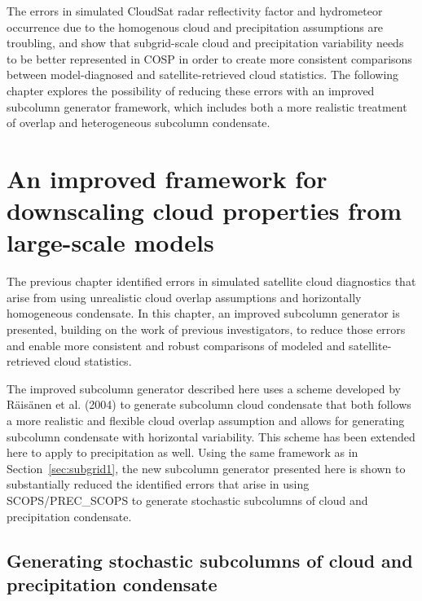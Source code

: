 The errors in simulated CloudSat radar reflectivity factor and
hydrometeor occurrence due to the homogenous cloud and precipitation
assumptions are troubling, and show that subgrid-scale cloud and
precipitation variability needs to be better represented in COSP in
order to create more consistent comparisons between model-diagnosed and
satellite-retrieved cloud statistics. The following chapter explores the
possibility of reducing these errors with an improved subcolumn
generator framework, which includes both a more realistic treatment of
overlap and heterogeneous subcolumn condensate.

\chapter{An improved framework for downscaling cloud properties from
large-scale models}\label{sec:subgrid2}

The previous chapter identified errors in simulated satellite cloud
diagnostics that arise from using unrealistic cloud overlap assumptions
and horizontally homogeneous condensate. In this chapter, an improved
subcolumn generator is presented, building on the work of previous
investigators, to reduce those errors and enable more consistent and
robust comparisons of modeled and satellite-retrieved cloud statistics.

The improved subcolumn generator described here uses a scheme developed
by Räisänen et al. (2004) to generate subcolumn cloud condensate that
both follows a more realistic and flexible cloud overlap assumption and
allows for generating subcolumn condensate with horizontal variability.
This scheme has been extended here to apply to precipitation as well.
Using the same framework as in Section~\ref{sec:subgrid1}, the new
subcolumn generator presented here is shown to substantially reduced the
identified errors that arise in using SCOPS/PREC\_SCOPS to generate
stochastic subcolumns of cloud and precipitation condensate.

\section{Generating stochastic subcolumns of cloud and precipitation
condensate}\label{sec:subgrid2ux5fgenerator}

